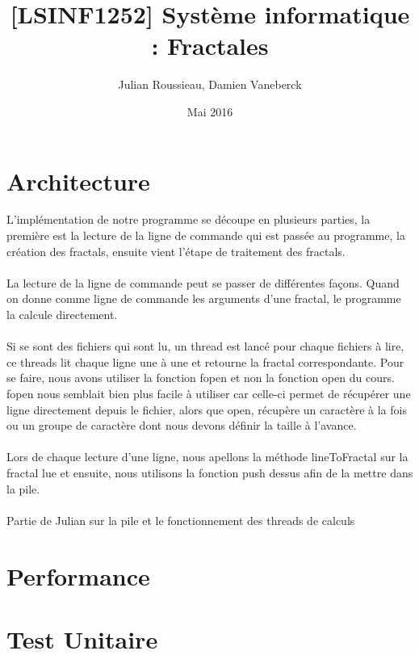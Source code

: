 \documentclass{article}
\title{[LSINF1252] Système informatique : Fractales}
\author{Julian Roussieau, Damien Vaneberck }
\date{Mai 2016}
\begin{document}
\maketitle

\section{Architecture}

L'implémentation de notre programme se découpe en plusieurs parties, la première est la lecture de la ligne de commande qui est passée au programme, la création des fractals, ensuite vient l'étape de traitement des fractals.
\\
\\
La lecture de la ligne de commande peut se passer de différentes façons. Quand on donne comme ligne de commande les arguments d'une fractal, le programme la calcule directement.
\\
\\
Si se sont des fichiers qui sont lu, un thread est lancé pour chaque fichiers à lire, ce threads lit chaque ligne une à une et retourne la fractal correspondante. Pour se faire, nous avons utiliser la fonction fopen et non la fonction open du cours. fopen nous semblait bien plus facile à utiliser car celle-ci permet de récupérer une ligne directement depuis le fichier, alors que open, récupère un caractère à la fois ou un groupe de caractère dont nous devons définir la taille à l'avance.
\\
\\
Lors de chaque lecture d'une ligne, nous apellons la méthode lineToFractal sur la fractal lue et ensuite, nous utilisons la fonction push dessus afin de la mettre dans la pile.
\\
\\
Partie de Julian sur la pile et le fonctionnement des threads de calculs
\\





\section{Performance}

\section{Test Unitaire}
\end{document}
